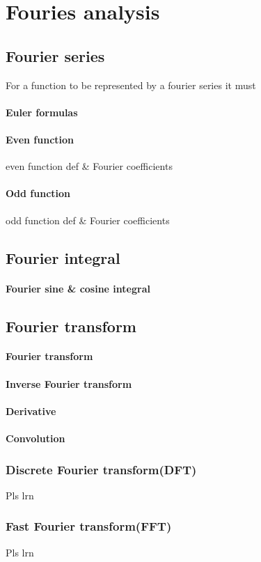 \section{Fouries analysis}

\subsection{Fourier series}
For a function to be represented by a fourier series it must
\paragraph{Euler formulas}
\paragraph{Even function} even function def & Fourier coefficients
\paragraph{Odd function}  odd function def & Fourier coefficients

\subsection{Fourier integral}
\paragraph{Fourier sine & cosine integral}

\subsection{Fourier transform}

\paragraph{Fourier transform}
\paragraph{Inverse Fourier transform}
\paragraph{Derivative}
\paragraph{Convolution}



\subsubsection{Discrete Fourier transform(DFT)}
Pls lrn

\subsubsection{Fast Fourier transform(FFT)}
Pls lrn

